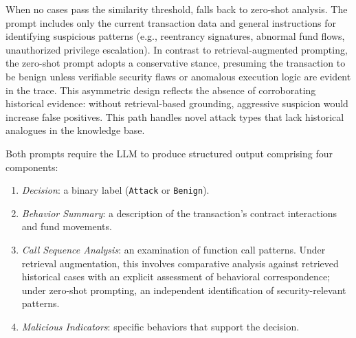 
When no cases pass the similarity threshold, \approach{} falls back to zero-shot analysis. The prompt includes only the current transaction data and general instructions for identifying suspicious patterns (e.g., reentrancy signatures, abnormal fund flows, unauthorized privilege escalation). In contrast to retrieval-augmented prompting, the zero-shot prompt adopts a conservative stance, presuming the transaction to be benign unless verifiable security flaws or anomalous execution logic are evident in the trace. This asymmetric design reflects the absence of corroborating historical evidence: without retrieval-based grounding, aggressive suspicion would increase false positives. This path handles novel attack types that lack historical analogues in the knowledge base.

Both prompts require the LLM to produce structured output comprising four components:
\begin{enumerate}
    \item \textit{Decision}: a binary label (\texttt{Attack} or \texttt{Benign}).
    \item \textit{Behavior Summary}: a description of the transaction's contract interactions and fund movements.
    \item \textit{Call Sequence Analysis}: an examination of function call patterns. Under retrieval augmentation, this involves comparative analysis against retrieved historical cases with an explicit assessment of behavioral correspondence; under zero-shot prompting, an independent identification of security-relevant patterns.
    \item \textit{Malicious Indicators}: specific behaviors that support the decision.
\end{enumerate}


